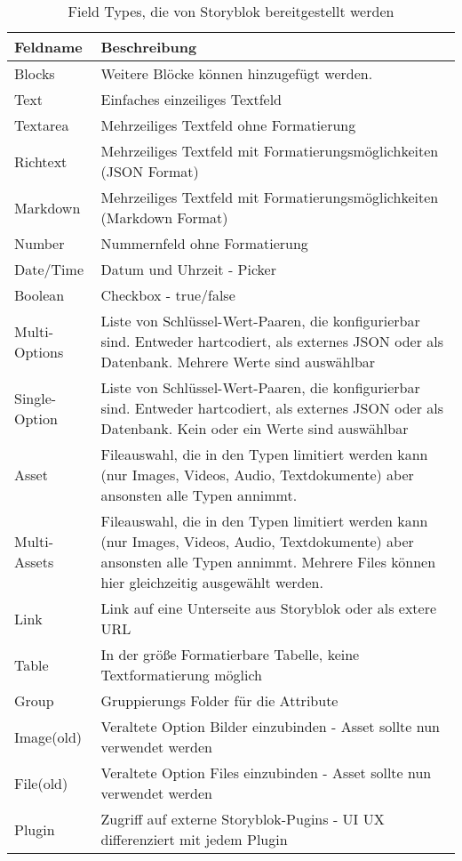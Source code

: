\begin{longtable}[c]{|l|p{10cm}|}
    \caption{Field Types, die von Storyblok bereitgestellt werden}
    \label{tab:beispiel} \\
    \hline
    \textbf{Feldname} & \textbf{Beschreibung} \\
    \hline
    \endhead
    \hline
    \endfoot
    Blocks & Weitere Blöcke können hinzugefügt werden. \\
    \hline
    Text & Einfaches einzeiliges Textfeld \\
    \hline
    Textarea & Mehrzeiliges Textfeld ohne Formatierung \\
    \hline
    Richtext & Mehrzeiliges Textfeld mit Formatierungsmöglichkeiten (JSON Format) \\
    \hline
    Markdown & Mehrzeiliges Textfeld mit Formatierungsmöglichkeiten (Markdown Format) \\
    \hline
    Number & Nummernfeld ohne Formatierung \\
    \hline
    Date/Time & Datum und Uhrzeit - Picker \\
    \hline
    Boolean & Checkbox - true/false \\
    \hline
    Multi-Options & Liste von Schlüssel-Wert-Paaren, die konfigurierbar sind. Entweder hartcodiert, als externes JSON oder als Datenbank. Mehrere Werte sind auswählbar \\
    \hline
    Single-Option & Liste von Schlüssel-Wert-Paaren, die konfigurierbar sind. Entweder hartcodiert, als externes JSON oder als Datenbank. Kein oder ein Werte sind auswählbar \\
    \hline
    Asset & Fileauswahl, die in den Typen limitiert werden kann (nur Images, Videos, Audio, Textdokumente) aber ansonsten alle Typen annimmt. \\
    \hline
    Multi-Assets & Fileauswahl, die in den Typen limitiert werden kann (nur Images, Videos, Audio, Textdokumente) aber ansonsten alle Typen annimmt. Mehrere Files können hier gleichzeitig ausgewählt werden. \\
    \hline
    Link & Link auf eine Unterseite aus Storyblok oder als extere URL \\
    \hline
    Table & In der größe Formatierbare Tabelle, keine Textformatierung möglich \\
    \hline
    Group & Gruppierungs Folder für die Attribute\\
    \hline
    Image(old) & Veraltete Option Bilder einzubinden - Asset sollte nun verwendet werden \\
    \hline
    File(old) & Veraltete Option Files einzubinden - Asset sollte nun verwendet werden \\
    \hline
    Plugin & Zugriff auf externe Storyblok-Pugins - UI UX differenziert mit jedem Plugin \\
    \hline
\end{longtable}


